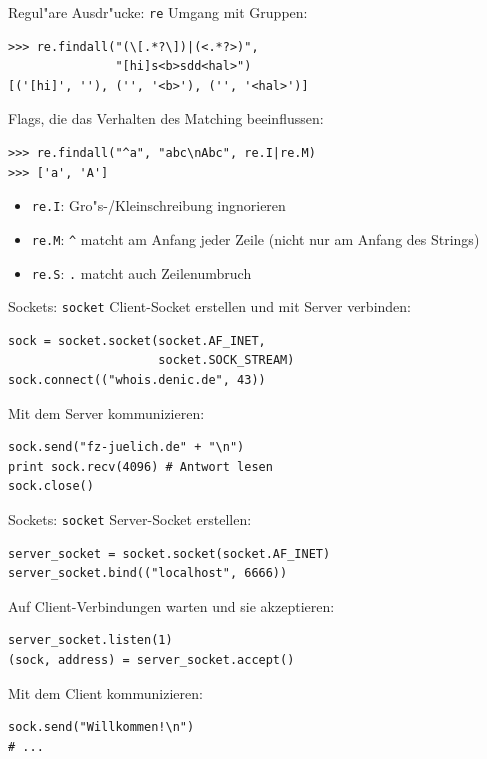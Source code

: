 \begin{frame}[fragile]{Regul"are Ausdr"ucke: \texttt{re}}
Umgang mit Gruppen:
\begin{lstlisting}[style=Shell]
>>> re.findall("(\[.*?\])|(<.*?>)", 
               "[hi]s<b>sdd<hal>")
[('[hi]', ''), ('', '<b>'), ('', '<hal>')]
\end{lstlisting}
\vspace*{2mm}
Flags, die das Verhalten des Matching beeinflussen:
\begin{lstlisting}[style=Shell]
>>> re.findall("^a", "abc\nAbc", re.I|re.M)
>>> ['a', 'A']
\end{lstlisting}
\begin{itemize}
\item \texttt{re.I}: Gro"s-/Kleinschreibung ingnorieren
\item \texttt{re.M}: \lstinline{^} matcht am Anfang jeder Zeile (nicht nur am Anfang des Strings)
\item \texttt{re.S}: \lstinline{.} matcht auch Zeilenumbruch
\end{itemize}
\end{frame}

\begin{frame}[fragile]{Sockets: \texttt{socket}}
Client-Socket erstellen und mit Server verbinden:
\begin{lstlisting}[style=Python]
sock = socket.socket(socket.AF_INET, 
                     socket.SOCK_STREAM)
sock.connect(("whois.denic.de", 43))
\end{lstlisting}
\vspace*{2mm}
Mit dem Server kommunizieren:
\begin{lstlisting}[style=Python]
sock.send("fz-juelich.de" + "\n")
print sock.recv(4096) # Antwort lesen
sock.close()
\end{lstlisting}
\end{frame}

\begin{frame}[fragile]{Sockets: \texttt{socket}}
Server-Socket erstellen:
\begin{lstlisting}[style=Python]
server_socket = socket.socket(socket.AF_INET)
server_socket.bind(("localhost", 6666))
\end{lstlisting}
\vspace*{2mm}
Auf Client-Verbindungen warten und sie akzeptieren:
\begin{lstlisting}[style=Python]
server_socket.listen(1)
(sock, address) = server_socket.accept()
\end{lstlisting}
\vspace*{2mm}
Mit dem Client kommunizieren:
\begin{lstlisting}[style=Python]
sock.send("Willkommen!\n")
# ...
\end{lstlisting}
\end{frame}

